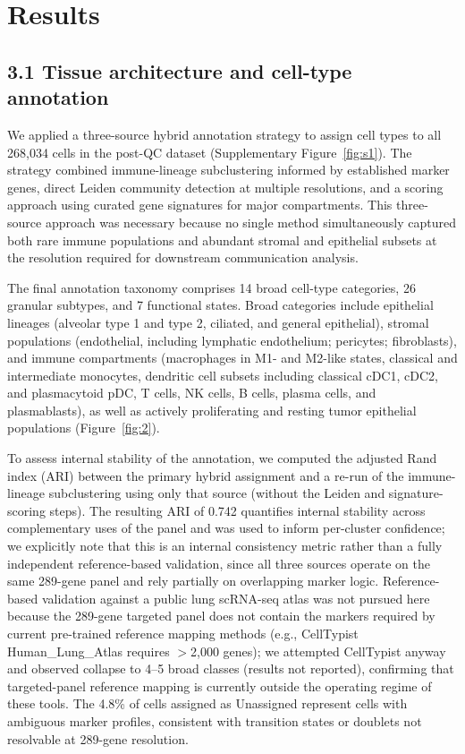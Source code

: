 \documentclass[12pt,a4paper]{article}
\begin{document}
\section*{Results}
\label{sec:results}

\subsection*{3.1 Tissue architecture and cell-type annotation}
We applied a three-source hybrid annotation strategy to assign cell types to all 268,034 cells in the post-QC dataset (Supplementary Figure~\ref{fig:s1}). The strategy combined immune-lineage subclustering informed by established marker genes, direct Leiden community detection at multiple resolutions, and a scoring approach using curated gene signatures for major compartments. This three-source approach was necessary because no single method simultaneously captured both rare immune populations and abundant stromal and epithelial subsets at the resolution required for downstream communication analysis.

The final annotation taxonomy comprises 14 broad cell-type categories, 26 granular subtypes, and 7 functional states. Broad categories include epithelial lineages (alveolar type 1 and type 2, ciliated, and general epithelial), stromal populations (endothelial, including lymphatic endothelium; pericytes; fibroblasts), and immune compartments (macrophages in M1- and M2-like states, classical and intermediate monocytes, dendritic cell subsets including classical cDC1, cDC2, and plasmacytoid pDC, T cells, NK cells, B cells, plasma cells, and plasmablasts), as well as actively proliferating and resting tumor epithelial populations (Figure~\ref{fig:2}).

To assess internal stability of the annotation, we computed the adjusted Rand index (ARI) between the primary hybrid assignment and a re-run of the immune-lineage subclustering using only that source (without the Leiden and signature-scoring steps). The resulting ARI of 0.742 quantifies internal stability across complementary uses of the panel and was used to inform per-cluster confidence; we explicitly note that this is an internal consistency metric rather than a fully independent reference-based validation, since all three sources operate on the same 289-gene panel and rely partially on overlapping marker logic. Reference-based validation against a public lung scRNA-seq atlas was not pursued here because the 289-gene targeted panel does not contain the markers required by current pre-trained reference mapping methods (e.g., CellTypist Human\_Lung\_Atlas requires $>$2,000 genes); we attempted CellTypist anyway and observed collapse to 4--5 broad classes (results not reported), confirming that targeted-panel reference mapping is currently outside the operating regime of these tools. The 4.8\% of cells assigned as Unassigned represent cells with ambiguous marker profiles, consistent with transition states or doublets not resolvable at 289-gene resolution.
\end{document}
